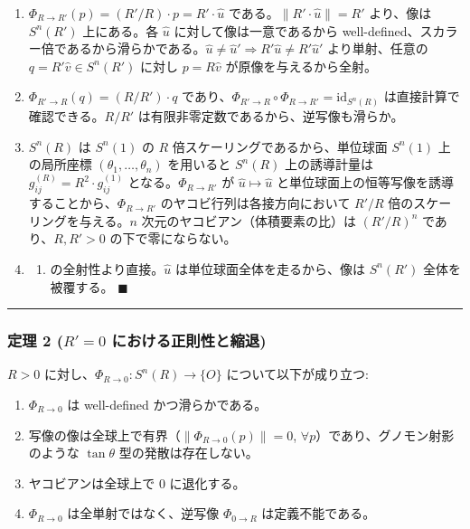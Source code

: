\documentclass[
  a4paper]{ltjsarticle}
\providecommand{\tightlist}{%
  \setlength{\itemsep}{0pt}\setlength{\parskip}{0pt}}
\begin{document}
\begin{enumerate}
\def\labelenumi{(\roman{enumi})}
\item
  \(\Phi_{R \to R'}(p) = (R'/R) \cdot p = R' \cdot \hat{u}\)
  である。\(\|R' \cdot \hat{u}\| = R'\) より、像は \(S^n(R')\)
  上にある。各 \(\hat{u}\) に対して像は一意であるから
  well-defined、スカラー倍であるから滑らかである。\(\hat{u} \neq \hat{u}' \Rightarrow R' \hat{u} \neq R' \hat{u}'\)
  より単射、任意の \(q = R' \hat{v} \in S^n(R')\) に対し
  \(p = R \hat{v}\) が原像を与えるから全射。
\item
  \(\Phi_{R' \to R}(q) = (R/R') \cdot q\)
  であり、\(\Phi_{R' \to R} \circ \Phi_{R \to R'} = \mathrm{id}_{S^n(R)}\)
  は直接計算で確認できる。\(R/R'\)
  は有限非零定数であるから、逆写像も滑らか。
\item
  \(S^n(R)\) は \(S^n(1)\) の \(R\) 倍スケーリングであるから、単位球面
  \(S^n(1)\) 上の局所座標 \((\theta_1, \ldots, \theta_n)\) を用いると
  \(S^n(R)\) 上の誘導計量は \(g_{ij}^{(R)} = R^2 \cdot g_{ij}^{(1)}\)
  となる。\(\Phi_{R \to R'}\) が \(\hat{u} \mapsto \hat{u}\)
  と単位球面上の恒等写像を誘導することから、\(\Phi_{R \to R'}\)
  のヤコビ行列は各接方向において \(R'/R\)
  倍のスケーリングを与える。\(n\) 次元のヤコビアン（体積要素の比）は
  \((R'/R)^n\) であり、\(R, R' > 0\) の下で零にならない。
\item
  \begin{enumerate}
  \def\labelenumii{(\roman{enumii})}
  \tightlist
  \item
    の全射性より直接。\(\hat{u}\) は単位球面全体を走るから、像は
    \(S^n(R')\) 全体を被覆する。 \(\blacksquare\)
  \end{enumerate}
\end{enumerate}

\begin{center}\rule{0.5\linewidth}{0.5pt}\end{center}

\subsubsection{\texorpdfstring{定理 2 (\(R' = 0\)
における正則性と縮退)}{定理 2 (R\textquotesingle{} = 0 における正則性と縮退)}}\label{ux5b9aux7406-2-r-0-ux306bux304aux3051ux308bux6b63ux5247ux6027ux3068ux7e2eux9000}

\(R > 0\) に対し、\(\Phi_{R \to 0} : S^n(R) \to \{O\}\)
について以下が成り立つ:

\begin{enumerate}
\def\labelenumi{(\roman{enumi})}
\tightlist
\item
  \(\Phi_{R \to 0}\) は well-defined かつ滑らかである。\\
\item
  写像の像は全球上で有界（\(\|\Phi_{R \to 0}(p)\| = 0\),
  \(\forall p\)）であり、グノモン射影のような \(\tan\theta\)
  型の発散は存在しない。\\
\item
  ヤコビアンは全球上で \(0\) に退化する。\\
\item
  \(\Phi_{R \to 0}\) は全単射ではなく、逆写像 \(\Phi_{0 \to R}\)
  は定義不能である。
\end{enumerate}
\end{document}
